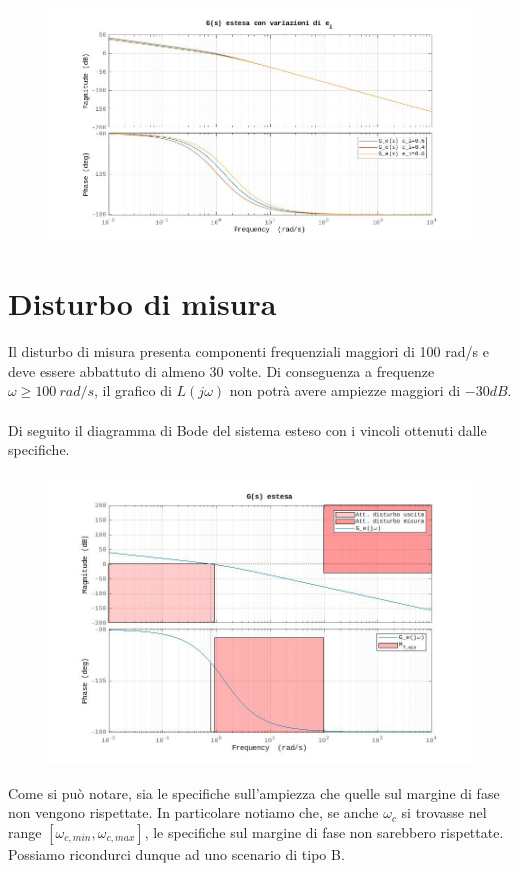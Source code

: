 \documentclass[a4paper,12pt,italian]{article}
\begin{document}
\begin{figure}[h!]
    \begin{center}
        \includegraphics[scale=0.5]{img/bode_GG_estesa_ei.jpg}
    \end{center}    
\end{figure}

\newpage

\section{Disturbo di misura}

Il disturbo di misura presenta componenti frequenziali maggiori di 100 rad/s e deve essere abbattuto di almeno 30 volte.
Di conseguenza a frequenze $\omega \geq 100~rad/s$, il grafico di $L(j\omega)$ non potrà avere ampiezze maggiori di $-30dB$.\\ \\
Di seguito il diagramma di Bode del sistema esteso con i vincoli ottenuti dalle specifiche.

\begin{figure}[h!]
    \begin{center}
        \includegraphics[scale=0.5]{img/bode_GG_estesa.jpg}
    \end{center}    
\end{figure}
Come si può notare, sia le specifiche sull'ampiezza che quelle sul margine di fase non vengono rispettate.
In particolare notiamo che, se anche $\omega_c$ si trovasse nel range $[\omega_{c,min}, \omega_{c,max}]$,
le specifiche sul margine di fase non sarebbero rispettate.
Possiamo ricondurci dunque ad uno scenario di tipo B.
\end{document}
